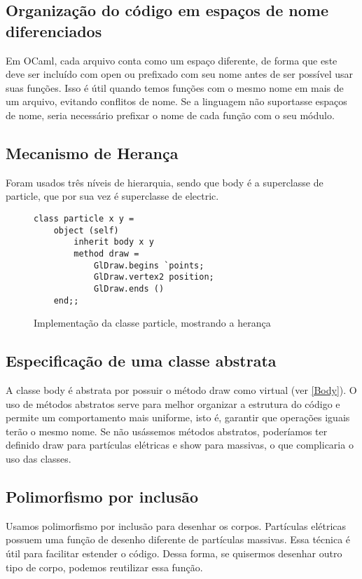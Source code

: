 \documentclass[a4paper,10pt]{article}
\begin{document}
\subsection{Organização do código em espaços de nome diferenciados}
	Em OCaml, cada arquivo conta como um espaço diferente, de forma que este deve ser incluído com open ou prefixado com seu nome antes de ser possível usar suas funções. Isso é útil quando temos funções com o mesmo nome em mais de um arquivo, evitando conflitos de nome. Se a linguagem não suportasse espaços de nome, seria necessário prefixar o nome de cada função com o seu módulo.
	
\subsection{Mecanismo de Herança}
	Foram usados três níveis de hierarquia, sendo que body é a superclasse de particle, que por sua vez é superclasse de electric.

	\begin{figure}[H]
	\centering	
	\begin{lstlisting}
class particle x y =
	object (self)
		inherit body x y
		method draw =
			GlDraw.begins `points;
			GlDraw.vertex2 position;
			GlDraw.ends ()
	end;;
	\end{lstlisting}
	\caption{Implementação da classe particle, mostrando a herança}
	\end{figure}

\subsection{Especificação de uma classe abstrata}
	A classe body é abstrata por possuir o método draw como virtual (ver \autoref{Body}). O uso de métodos abstratos serve para melhor organizar a estrutura do código e permite um comportamento mais uniforme, isto é, garantir que operações iguais terão o mesmo nome. Se não usássemos métodos abstratos, poderíamos ter definido draw para partículas elétricas e show para massivas, o que complicaria o uso das classes.

\subsection{Polimorfismo por inclusão}
	
	Usamos polimorfismo por inclusão para desenhar os corpos. Partículas elétricas possuem uma função de desenho diferente de partículas massivas. Essa técnica é útil para facilitar estender o código. Dessa forma, se quisermos desenhar outro tipo de corpo, podemos reutilizar essa função.
	
\end{document}
